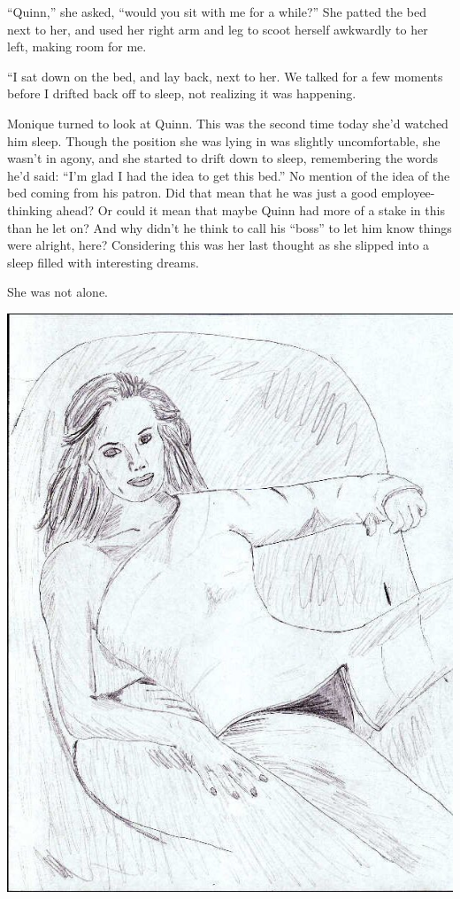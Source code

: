 ``Quinn,'' she asked, ``would you sit with me for a while?'' She patted the bed next to
her, and used her right arm and leg to scoot herself awkwardly to her left, making room for me.

``I sat down on the bed, and lay back, next to her. We talked for a few moments before I
drifted back off to sleep, not realizing it was happening.

\begin{thought}
Monique turned to look at Quinn. This was the second time today she'd watched him sleep.
Though the position she was lying in was slightly uncomfortable, she wasn't in agony, and she
started to drift down to sleep, remembering the words he'd said: ``I'm glad I had the
idea to get this bed.'' No mention of the idea of the bed coming from his patron. Did that mean
that he was just a good employee- thinking ahead? Or could it mean that maybe Quinn had more of
a stake in this than he let on? And why didn't he think to call his ``boss'' to let him know
things were alright, here? Considering this was her last thought as she slipped into a sleep
filled with interesting dreams.
\end{thought}

She was not alone.

\newpage
\begin{center}
\includegraphics{images/kicks27.jpg}
\end{center}
